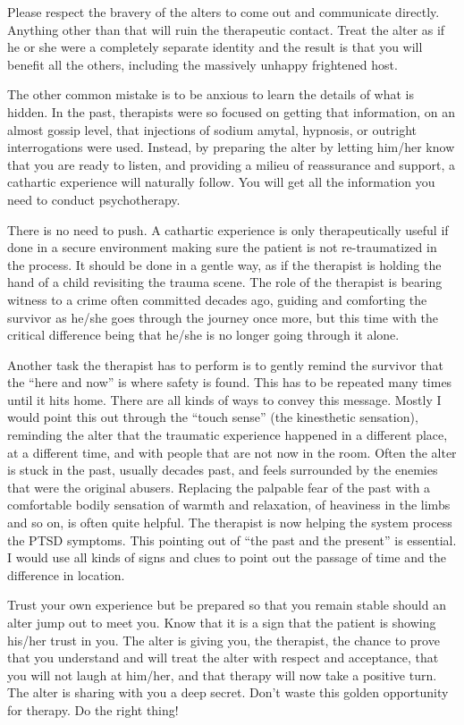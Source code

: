 \documentclass[]{book}
\begin{document}
Please respect the bravery of the alters to come out and communicate directly. Anything other than that will ruin the therapeutic contact. Treat the alter as if he or she were a completely separate identity and the result is that you will benefit all the others, including the massively unhappy frightened host.

The other common mistake is to be anxious to learn the details of what is hidden. In the past, therapists were so focused on getting that information, on an almost gossip level, that injections of sodium amytal, hypnosis, or outright interrogations were used. Instead, by preparing the alter by letting him/her know that you are ready to listen, and providing a milieu of reassurance and support, a cathartic experience will naturally follow. You will get all the information you need to conduct psychotherapy.

There is no need to push. A cathartic experience is only therapeutically useful if done in a secure environment making sure the patient is not re-traumatized in the process. It should be done in a gentle way, as if the therapist is holding the hand of a child revisiting the trauma scene. The role of the therapist is bearing witness to a crime often committed decades ago, guiding and comforting the survivor as he/she goes through the journey once more, but this time with the critical difference being that he/she is no longer going through it alone.

Another task the therapist has to perform is to gently remind the survivor that the ``here and now'' is where safety is found. This has to be repeated many times until it hits home. There are all kinds of ways to convey this message. Mostly I would point this out through the ``touch sense'' (the kinesthetic sensation), reminding the alter that the traumatic experience happened in a different place, at a different time, and with people that are not now in the room. Often the alter is stuck in the past, usually decades past, and feels surrounded by the enemies that were the original abusers. Replacing the palpable fear of the past with a comfortable bodily sensation of warmth and relaxation, of heaviness in the limbs and so on, is often quite helpful. The therapist is now helping the system process the PTSD symptoms. This pointing out of ``the past and the present'' is essential. I would use all kinds of signs and clues to point out the passage of time and the difference in location.

Trust your own experience but be prepared so that you remain stable should an alter jump out to meet you. Know that it is a sign that the patient is showing his/her trust in you. The alter is giving you, the therapist, the chance to prove that you understand and will treat the alter with respect and acceptance, that you will not laugh at him/her, and that therapy will now take a positive turn. The alter is sharing with you a deep secret. Don't waste this golden opportunity for therapy. Do the right thing!
\end{document}
